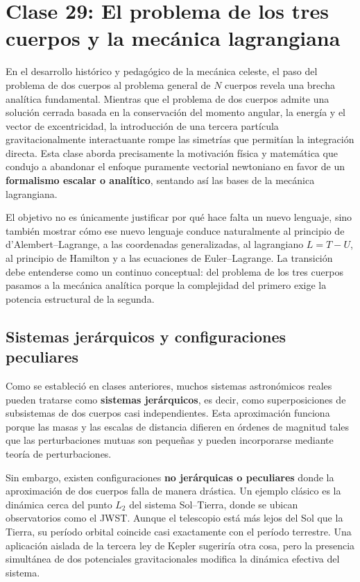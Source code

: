 \chapter{Clase 29: El problema de los tres cuerpos y la mecánica lagrangiana}

En el desarrollo histórico y pedagógico de la mecánica celeste, el paso del problema de dos cuerpos al problema general de \(N\) cuerpos revela una brecha analítica fundamental. Mientras que el problema de dos cuerpos admite una solución cerrada basada en la conservación del momento angular, la energía y el vector de excentricidad, la introducción de una tercera partícula gravitacionalmente interactuante rompe las simetrías que permitían la integración directa. Esta clase aborda precisamente la motivación física y matemática que condujo a abandonar el enfoque puramente vectorial newtoniano en favor de un \textbf{formalismo escalar o analítico}, sentando así las bases de la mecánica lagrangiana.

El objetivo no es únicamente justificar por qué hace falta un nuevo lenguaje, sino también mostrar cómo ese nuevo lenguaje conduce naturalmente al principio de d'Alembert--Lagrange, a las coordenadas generalizadas, al lagrangiano \(L=T-U\), al principio de Hamilton y a las ecuaciones de Euler--Lagrange. La transición debe entenderse como un continuo conceptual: del problema de los tres cuerpos pasamos a la mecánica analítica porque la complejidad del primero exige la potencia estructural de la segunda.

\section{Sistemas jerárquicos y configuraciones peculiares}
Como se estableció en clases anteriores, muchos sistemas astronómicos reales pueden tratarse como \textbf{sistemas jerárquicos}, es decir, como superposiciones de subsistemas de dos cuerpos casi independientes. Esta aproximación funciona porque las masas y las escalas de distancia difieren en órdenes de magnitud tales que las perturbaciones mutuas son pequeñas y pueden incorporarse mediante teoría de perturbaciones.

Sin embargo, existen configuraciones \textbf{no jerárquicas o peculiares} donde la aproximación de dos cuerpos falla de manera drástica. Un ejemplo clásico es la dinámica cerca del punto \(L_2\) del sistema Sol--Tierra, donde se ubican observatorios como el JWST. Aunque el telescopio está más lejos del Sol que la Tierra, su período orbital coincide casi exactamente con el período terrestre. Una aplicación aislada de la tercera ley de Kepler sugeriría otra cosa, pero la presencia simultánea de dos potenciales gravitacionales modifica la dinámica efectiva del sistema.

